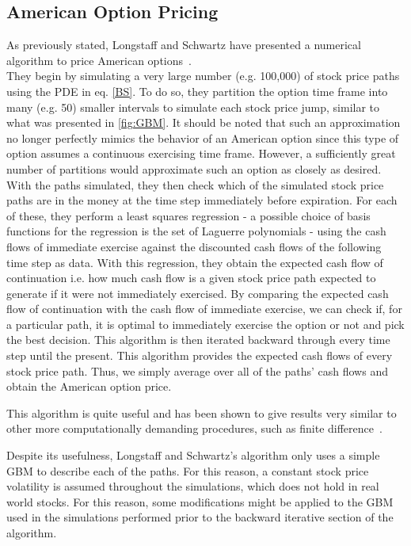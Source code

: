 \documentclass[a4paper,twocolumn,aps,prd,longbibliography,superscriptaddress]{revtex4-1}
\begin{document}
\subsection{American Option Pricing}
As previously stated, Longstaff and Schwartz have presented a numerical algorithm to price American options~\cite{Longstaff}.\\
They begin by simulating a very large number (e.g. 100,000) of stock price paths using the PDE in eq. \eqref{BS}. To do so, they partition the option time frame into many (e.g. 50) smaller intervals to simulate each stock price jump, similar to what was presented in \autoref{fig:GBM}. It should be noted that such an approximation no longer perfectly mimics the behavior of an American option since this type of option assumes a continuous exercising time frame. However, a sufficiently great number of partitions would approximate such an option as closely as desired.\\
With the paths simulated, they then check which of the simulated stock price paths are in the money at the time step immediately before expiration. For each of these, they perform a least squares regression - a possible choice of basis functions for the regression is the set of Laguerre polynomials - using the cash flows of immediate exercise against the discounted cash flows of the following time step as data.
With this regression, they obtain the expected cash flow of continuation i.e. how much cash flow is a given stock price path expected to generate if it were not immediately exercised.
By comparing the expected cash flow of continuation with the cash flow of immediate exercise, we can check if, for a particular path, it is optimal to immediately exercise the option or not and pick the best decision.
This algorithm is then iterated backward through every time step until the present.
This algorithm provides the expected cash flows of every stock price path. Thus, we simply average over all of the paths' cash flows and obtain the American option price.

This algorithm is quite useful and has been shown to give results very similar to other more computationally demanding procedures, such as finite difference~\cite{Longstaff}.

Despite its usefulness, Longstaff and Schwartz's algorithm only uses a simple GBM to describe each of the paths. For this reason, a constant stock price volatility is assumed throughout the simulations, which does not hold in real world stocks.
For this reason, some modifications might be applied to the GBM used in the simulations performed prior to the backward iterative section of the algorithm.
\end{document}
